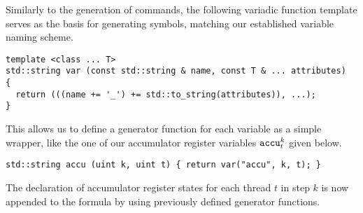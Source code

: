 
%

\noindent
Similarly to the generation of {\SMTLIB} commands, the following variadic function template serves as the basis for generating symbols, matching our established variable naming scheme.

\begin{lstlisting}[style=c++]
template <class ... T>
std::string var (const std::string & name, const T & ... attributes)
{
  return (((name += '_') += std::to_string(attributes)), ...);
}
\end{lstlisting}

\noindent
This allows us to define a generator function for each variable as a simple wrapper, %
like the one of our accumulator register variables $\texttt{accu}^k_t$ given below.



\begin{lstlisting}[style=c++]
std::string accu (uint k, uint t) { return var("accu", k, t); }
\end{lstlisting}

\noindent
The declaration of accumulator register states for each thread $t$ in step $k$ is now appended to the formula by using previously defined generator functions.

